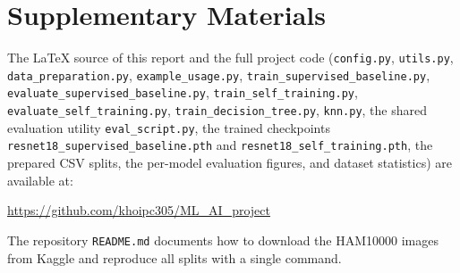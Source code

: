 \documentclass[conference]{IEEEtran}
\begin{document}
\section{Supplementary Materials}
\label{sec:supp}
The LaTeX source of this report and the full project code
(\texttt{config.py}, \texttt{utils.py}, \texttt{data\_preparation.py},
\texttt{example\_usage.py},
\texttt{train\_supervised\_baseline.py},
\texttt{evaluate\_supervised\_baseline.py},
\texttt{train\_self\_training.py},
\texttt{evaluate\_self\_training.py},
\texttt{train\_decision\_tree.py},
\texttt{knn.py},
the shared evaluation utility \texttt{eval\_script.py},
the trained checkpoints \texttt{resnet18\_supervised\_baseline.pth}
and \texttt{resnet18\_self\_training.pth},
the prepared CSV splits, the per-model evaluation figures, and
dataset statistics) are available at:
\begin{center}
\url{https://github.com/khoipc305/ML_AI_project}
\end{center}
The repository \texttt{README.md} documents how to download the
HAM10000 images from Kaggle \cite{kaggle2018} and reproduce all
splits with a single command.
\end{document}
